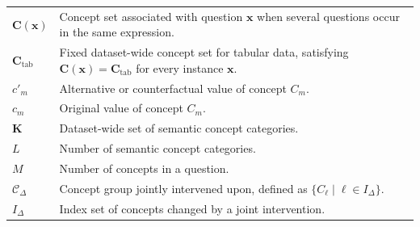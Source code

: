 \begin{longtable}{@{}>{\raggedright\arraybackslash}p{} p{}@{}}
	$\mathbf{C}(\mathbf{x})$                           & Concept set associated with question $\mathbf{x}$ when several questions occur in the same expression.                                                                                                             \\
	$\mathbf{C}_{\mathrm{tab}}$                        & Fixed dataset-wide concept set for tabular data, satisfying $\mathbf{C}(\mathbf{x})=\mathbf{C}_{\mathrm{tab}}$ for every instance $\mathbf{x}$.                                                                    \\
	$c'_m$                                             & Alternative or counterfactual value of concept $C_m$.                                                                                                                                                              \\
	$c_m$                                              & Original value of concept $C_m$.                                                                                                                                                                                   \\
	$\mathbf{K}$                                       & Dataset-wide set of semantic concept categories.                                                                                                                                                                   \\
	$L$                                                & Number of semantic concept categories.                                                                                                                                                                             \\
	$M$                                                & Number of concepts in a question.                                                                                                                                                                                  \\
	$\mathcal{C}_{\Delta}$                             & Concept group jointly intervened upon, defined as $\{C_\ell \mid \ell \in I_{\Delta}\}$.                                                                                                                           \\
	$I_{\Delta}$                                       & Index set of concepts changed by a joint intervention.                                                                                                                                                             \\

\end{longtable}
